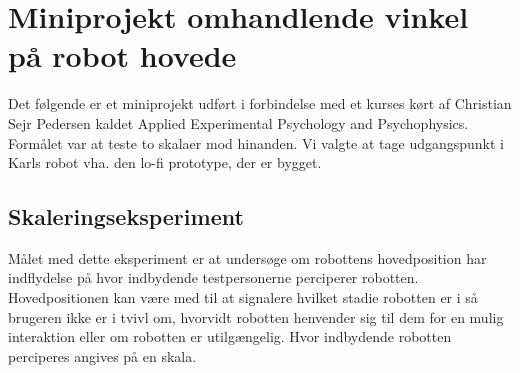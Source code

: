 \section{Miniprojekt omhandlende vinkel på robot hovede}
Det følgende er et miniprojekt udført i forbindelse med et kurses kørt af Christian Sejr Pedersen kaldet Applied Experimental Psychology and Psychophysics. Formålet var at teste to skalaer mod hinanden. Vi valgte at tage udgangspunkt i Karls robot vha. den lo-fi prototype, der er bygget.

\subsection*{Skaleringseksperiment}
Målet med dette eksperiment er at undersøge om robottens hovedposition har indflydelse på hvor indbydende testpersonerne perciperer robotten. Hovedpositionen kan være med til at signalere hvilket stadie robotten er i så brugeren ikke er i tvivl om, hvorvidt robotten henvender sig til dem for en mulig interaktion eller om robotten er utilgængelig. Hvor indbydende robotten perciperes angives på en skala.

